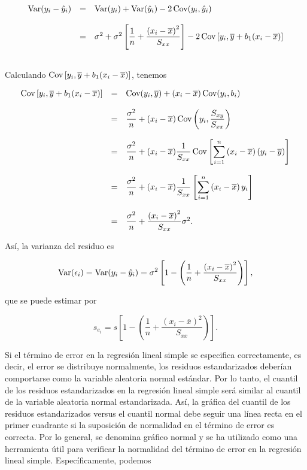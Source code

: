$$
\begin{array}{rcl}
    \mathop{\mbox{\normalfont Var}}\nolimits(y_i-\hat{y}_i) &=& \mathop{\mbox{\normalfont Var}}\nolimits(y_i)+\mathop{\mbox{\normalfont Var}}\nolimits(\hat{y}_i)-2\mathop{\mbox{\normalfont Cov}}\nolimits(y_i,\hat{y}_i)\\\\
			&=& \sigma^2+\sigma^2\left[\dfrac{1}{n}+\dfrac{\left(x_i-\overline{x}\right)^2}{S_{xx}}\right]-2\mathop{\mbox{\normalfont Cov}}\nolimits\left[y_i,\overline{y}+b_1(x_i-\overline{x})\right]\\\\
\end{array}
$$

Calculando $\mathop{\mbox{\normalfont Cov}}\nolimits\left[y_i,\overline{y}+b_1(x_i-\overline{x})\right]$, tenemos

$$
\begin{array}{rcl}
    \Cov\left[y_i,\overline{y}+b_1(x_i-\overline{x})\right] &=& \Cov(y_i,\overline{y}) + (x_i-\overline{x})\Cov(y_i,b_i)\\\\
							    &=& \dfrac{\sigma^2}{n} + (x_i-\overline{x})\Cov\left(y_i,\dfrac{S_{xy}}{S_{xx}}\right)\\\\
							    &=& \dfrac{\sigma^2}{n} + (x_i-\overline{x})\dfrac{1}{S_{xx}}\Cov\left[\displaystyle\sum_{i=1}^n\left(x_i-\overline{x}\right)(y_i-\overline{y})\right]\\\\
							    &=& \dfrac{\sigma^2}{n} + (x_i-\overline{x})\dfrac{1}{S_{xx}}\left[\displaystyle\sum_{i=1}^n\left(x_i-\overline{x}\right)y_i\right]\\\\
							    &=& \dfrac{\sigma^2}{n} + \dfrac{\left(x_i-\overline{x}\right)^2}{S_{xx}}\sigma^2.

\end{array}
$$

Así, la varianza del residuo es

\begin{tcolorbox}
    $$\mathop{\mbox{\normalfont Var}}\nolimits(\epsilon_i)=\mathop{\mbox{\normalfont Var}}\nolimits(y_i-\hat{y}_i)=\sigma^2\left[1-\left(\dfrac{1}{n}+\dfrac{\left(x_i-\overline{x}\right)^2}{S_{xx}}\right)\right],$$
\end{tcolorbox}

que se puede estimar por

\begin{tcolorbox}
    $$s_{e_i}=s\left[1-\left(\dfrac{1}{n}+\dfrac{\left(x_i-\overline{x}\right)^2}{S_{xx}}\right)\right].$$
\end{tcolorbox}

Si el término de error en la regresión lineal simple se especifica correctamente, es decir, el error se distribuye normalmente, los residuos estandarizados deberían comportarse como la variable aleatoria normal estándar. Por lo tanto, el cuantil de los residuos estandarizados en la regresión lineal simple será similar al cuantil de la variable aleatoria normal estandarizada. Así, la gráfica del cuantil de los residuos estandarizados versus el cuantil normal debe seguir una línea recta en el primer cuadrante si la suposición de normalidad en el término de error es correcta. Por lo general, se denomina gráfico normal y se ha utilizado como una herramienta útil para verificar la normalidad del término de error en la regresión lineal simple. Específicamente, podemos

